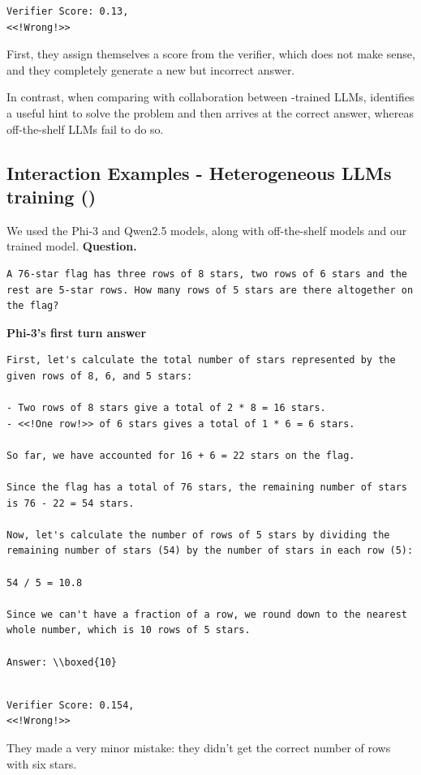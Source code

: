 \begin{lstlisting}
Verifier Score: 0.13,
<<!Wrong!>> 
\end{lstlisting}
First, they assign themselves a score from the verifier, which does not make sense, and they completely generate a new but incorrect answer.

In contrast, when comparing with collaboration between \oursspace-trained LLMs, \oursspace identifies a useful hint to solve the problem and then arrives at the correct answer, whereas off-the-shelf LLMs fail to do so.
\subsection{Interaction Examples - Heterogeneous  LLMs training  ()}
We used the Phi-3 and Qwen2.5 models, along with off-the-shelf models and our \oursspace trained model.
\textbf{Question. }
\begin{lstlisting}[breaklines=true]
A 76-star flag has three rows of 8 stars, two rows of 6 stars and the rest are 5-star rows. How many rows of 5 stars are there altogether on the flag?

\end{lstlisting}
\textbf{Phi-3's first turn answer} 
\begin{lstlisting}[breaklines=true]
First, let's calculate the total number of stars represented by the given rows of 8, 6, and 5 stars:

- Two rows of 8 stars give a total of 2 * 8 = 16 stars.
- <<!One row!>> of 6 stars gives a total of 1 * 6 = 6 stars.

So far, we have accounted for 16 + 6 = 22 stars on the flag.

Since the flag has a total of 76 stars, the remaining number of stars is 76 - 22 = 54 stars.

Now, let's calculate the number of rows of 5 stars by dividing the remaining number of stars (54) by the number of stars in each row (5):

54 / 5 = 10.8

Since we can't have a fraction of a row, we round down to the nearest whole number, which is 10 rows of 5 stars.

Answer: \\boxed{10}


\end{lstlisting}
\begin{lstlisting}
Verifier Score: 0.154,
<<!Wrong!>> 
\end{lstlisting}
They made a very minor mistake: they didn't get the correct number of rows with six stars.

